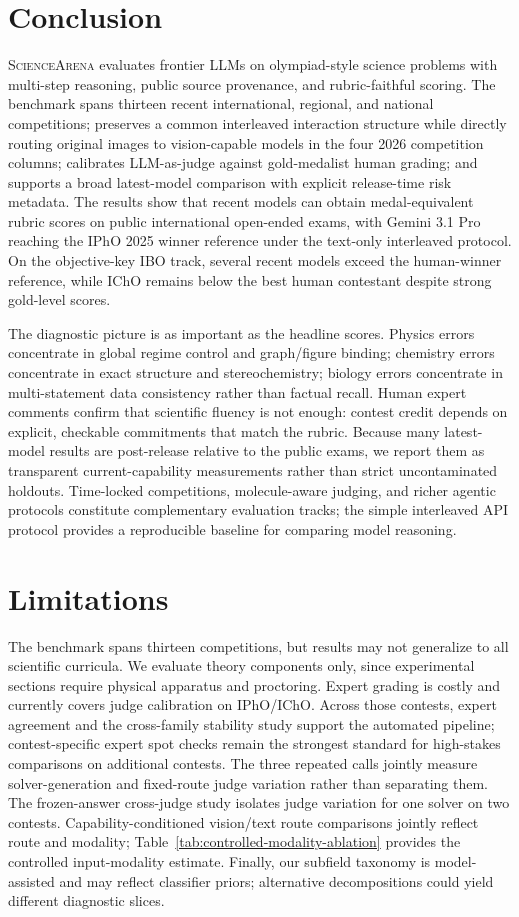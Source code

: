 \documentclass[11pt]{article}
\begin{document}
\section{Conclusion}
\textsc{ScienceArena} evaluates frontier LLMs on olympiad-style science problems with multi-step reasoning, public source provenance, and rubric-faithful scoring.
The benchmark spans thirteen recent international, regional, and national competitions; preserves a common interleaved interaction structure while directly routing original images to vision-capable models in the four 2026 competition columns; calibrates LLM-as-judge against gold-medalist human grading; and supports a broad latest-model comparison with explicit release-time risk metadata.
The results show that recent models can obtain medal-equivalent rubric scores on public international open-ended exams, with Gemini 3.1 Pro reaching the IPhO 2025 winner reference under the text-only interleaved protocol.
On the objective-key IBO track, several recent models exceed the human-winner reference, while IChO remains below the best human contestant despite strong gold-level scores.

The diagnostic picture is as important as the headline scores.
Physics errors concentrate in global regime control and graph/figure binding; chemistry errors concentrate in exact structure and stereochemistry; biology errors concentrate in multi-statement data consistency rather than factual recall.
Human expert comments confirm that scientific fluency is not enough: contest credit depends on explicit, checkable commitments that match the rubric.
Because many latest-model results are post-release relative to the public exams, we report them as transparent current-capability measurements rather than strict uncontaminated holdouts.
Time-locked competitions, molecule-aware judging, and richer agentic protocols constitute complementary evaluation tracks; the simple interleaved API protocol provides a reproducible baseline for comparing model reasoning.


\clearpage
\section*{Limitations}
The benchmark spans thirteen competitions, but results may not generalize to all scientific curricula.
We evaluate theory components only, since experimental sections require physical apparatus and proctoring.
Expert grading is costly and currently covers judge calibration on IPhO/IChO. Across those contests, expert agreement and the cross-family stability study support the automated pipeline; contest-specific expert spot checks remain the strongest standard for high-stakes comparisons on additional contests.
The three repeated calls jointly measure solver-generation and fixed-route judge variation rather than separating them. The frozen-answer cross-judge study isolates judge variation for one solver on two contests. Capability-conditioned vision/text route comparisons jointly reflect route and modality; Table~\ref{tab:controlled-modality-ablation} provides the controlled input-modality estimate.
Finally, our subfield taxonomy is model-assisted and may reflect classifier priors; alternative decompositions could yield different diagnostic slices.
\end{document}
